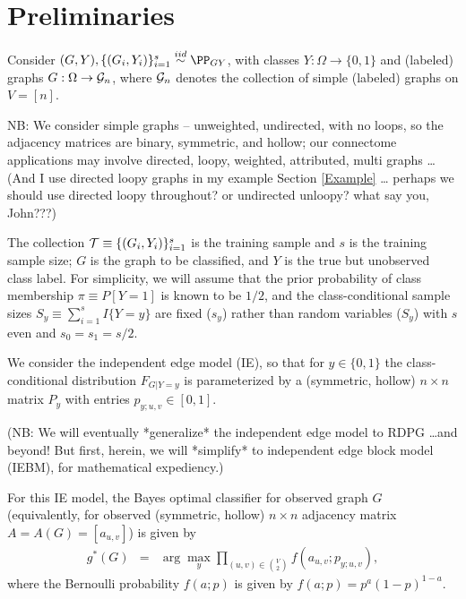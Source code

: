 


\section{Preliminaries} %
\label{sec:preliminaries}



Consider $(G,Y),\{(G_i,Y_i)\}_{i=1}^s \overset{iid}{\sim} \PP_{GY}$,
with classes $Y:\Omega \rightarrow \{0,1\}$ and
(labeled) graphs $G:\Omega \rightarrow \mathcal{G}_n$,
where $\mathcal{G}_n$ denotes the collection of simple (labeled) graphs on $V=[n]$.

NB:
We consider simple graphs -- unweighted, undirected, with no loops,
so the adjacency matrices are binary, symmetric, and hollow;
our connectome applications
may involve {directed, loopy, weighted, attributed, multi} graphs \ldots
(And I use directed loopy graphs in my example Section \ref{Example} \dots
perhaps we should use directed loopy throughout? or undirected unloopy? what say you, John???)

The collection
$\mathcal{T} \equiv \{(G_i,Y_i)\}_{i=1}^s$ is the training sample
and $s$ is the training sample size;
$G$ is the graph to be classified,
and $Y$ is the true but unobserved class label.
For simplicity, we will assume that the prior probability of class membership
$\pi \equiv P[Y=1]$ is known to be $1/2$,
and the class-conditional sample sizes $S_y \equiv \sum_{i=1}^s I\{Y=y\}$
are fixed ($s_y$) rather than random variables ($S_y$)
with $s$ even and $s_0=s_1=s/2$.

We consider the independent edge model (IE),
so that for $y \in \{0,1\}$ the class-conditional distribution $F_{G|Y=y}$
is parameterized by a (symmetric, hollow)
$n \times n$ matrix $P_y$ with entries $p_{y;u,v} \in [0,1]$.

(NB: We will eventually *generalize* the independent edge model to RDPG \ldots and beyond!
But first, herein, we will *simplify* to independent edge block model (IEBM), for mathematical expediency.)

For this IE model, the Bayes optimal classifier for observed graph $G$
(equivalently, for observed (symmetric, hollow) $n \times n$ adjacency matrix $A=A(G)=[a_{u,v}]$)
is given by
\begin{eqnarray}
g^*(G) &=& \arg\max_y \prod_{(u,v) \in {V \choose 2}} f(a_{u,v};p_{y;u,v}),
\end{eqnarray}
where the Bernoulli probability $f(a;p)$ is given by
$f(a;p) = p^{a} (1-p)^{1-a}$.

